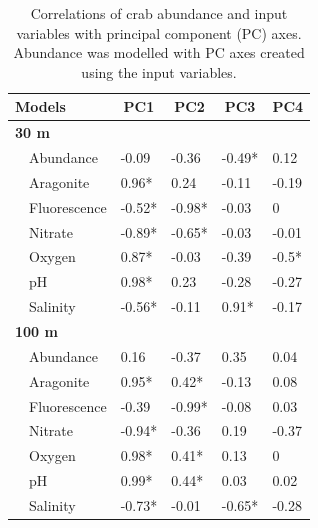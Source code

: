 \documentclass[letterpaper,12pt]{article}\usepackage[]{graphicx}\usepackage[]{color}
\begin{document}
\begin{landscape}
\centering\vspace*{\fill}
\begin{table}[!tbp]
\caption{Correlations of crab abundance and input variables with principal component (PC) axes. Abundance was modelled with PC axes created using the input variables.\label{tab:pcacor}} 
\begin{center}
\begin{tabular}{lllll}
\hline\hline
\multicolumn{1}{l}{Models}&\multicolumn{1}{c}{PC1}&\multicolumn{1}{c}{PC2}&\multicolumn{1}{c}{PC3}&\multicolumn{1}{c}{PC4}\tabularnewline
\hline
{\bfseries 30 m}&&&&\tabularnewline
~~Abundance&-0.09&-0.36&-0.49*&0.12\tabularnewline
~~Aragonite&0.96*&0.24&-0.11&-0.19\tabularnewline
~~Fluorescence&-0.52*&-0.98*&-0.03&0\tabularnewline
~~Nitrate&-0.89*&-0.65*&-0.03&-0.01\tabularnewline
~~Oxygen&0.87*&-0.03&-0.39&-0.5*\tabularnewline
~~pH&0.98*&0.23&-0.28&-0.27\tabularnewline
~~Salinity&-0.56*&-0.11&0.91*&-0.17\tabularnewline
\hline
{\bfseries 100 m}&&&&\tabularnewline
~~Abundance&0.16&-0.37&0.35&0.04\tabularnewline
~~Aragonite&0.95*&0.42*&-0.13&0.08\tabularnewline
~~Fluorescence&-0.39&-0.99*&-0.08&0.03\tabularnewline
~~Nitrate&-0.94*&-0.36&0.19&-0.37\tabularnewline
~~Oxygen&0.98*&0.41*&0.13&0\tabularnewline
~~pH&0.99*&0.44*&0.03&0.02\tabularnewline
~~Salinity&-0.73*&-0.01&-0.65*&-0.28\tabularnewline
\hline
\end{tabular}\end{center}
\end{table}

\end{landscape}
\end{document}
